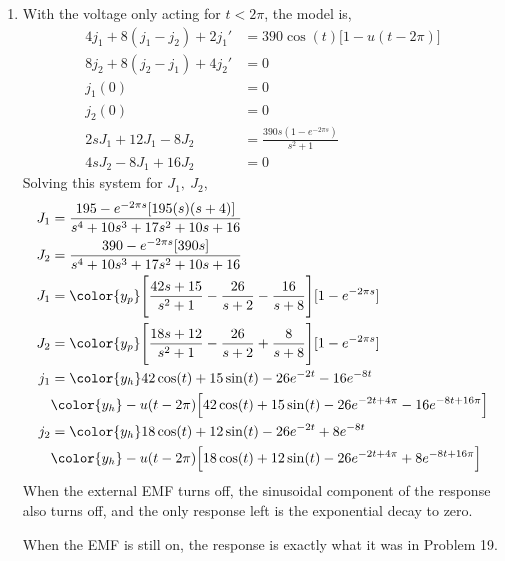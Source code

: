 \begin{enumerate}
    \item With the voltage only acting for $ t < 2\pi $, the model is,
          \begin{align}
              4j_1 + 8(j_1 - j_2) + 2j_1' & = 390 \cos(t) \Big[1 - u(t - 2\pi)\Big] \\
              8j_2 +8(j_2 - j_1) + 4j_2'  & = 0                                     \\
              j_1(0)                      & = 0                                     \\
              j_2(0)                      & = 0                                     \\
              2sJ_1 + 12J_1 - 8J_2        & = \frac{390s(1 - e^{-2\pi s})}{s^2 + 1} \\
              4sJ_2 - 8J_1 + 16J_2        & = 0
          \end{align}
          Solving this system for $ J_1,\ J_2 $,
          \begin{align}
              J_1 & = \frac{195 - e^{-2\pi s}[195(s)(s+4)]}
              {s^4 + 10s^3 + 17s^2 + 10s + 16}                                       \\
              J_2 & = \frac{390 - e^{-2\pi s}[390s]}{s^4 + 10s^3 + 17s^2 + 10s + 16} \\
              J_1 & = \color{y_p} \Bigg[\frac{42s + 15}{s^2 + 1}
              - \frac{26}{s+2} - \frac{16}{s + 8}\Bigg] [1 - e^{-2\pi s}]            \\
              J_2 & = \color{y_p} \Bigg[ \frac{18s + 12}{s^2 + 1}
              - \frac{26}{s+2} + \frac{8}{s + 8}\Bigg] [1 - e^{-2\pi s}]             \\
              j_1 & = \color{y_h} 42\cos(t) + 15\sin(t) - 26e^{-2t} - 16e^{-8t}      \\
                  & \color{y_h} - u(t - 2\pi) \Big[ 42\cos(t) + 15\sin(t)
              - 26e^{-2t + 4\pi} - 16e^{-8t + 16\pi} \Big]                           \\
              j_2 & = \color{y_h} 18\cos(t) + 12\sin(t) - 26e^{-2t} + 8e^{-8t}       \\
                  & \color{y_h} - u(t - 2\pi) \Big[ 18\cos(t) + 12\sin(t)
                  - 26e^{-2t + 4\pi} + 8e^{-8t + 16\pi} \Big]
          \end{align}
          When the external EMF turns off, the sinusoidal component of the response
          also turns off, and the only response left is the exponential decay to zero.
          \par When the EMF is still on, the response is exactly what it was in Problem
          19.
\end{enumerate}